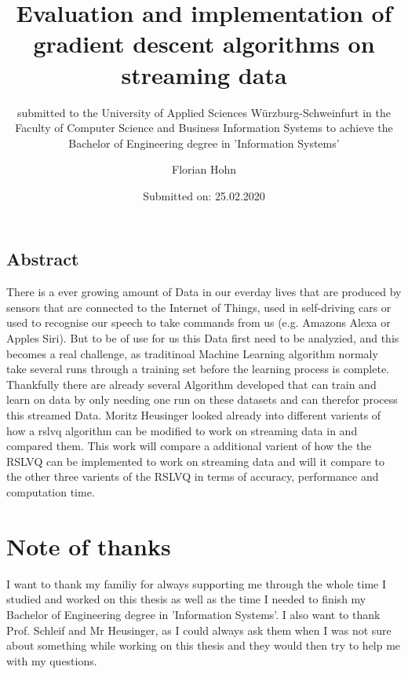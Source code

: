 \documentclass[12pt,oneside,a4paper,parskip]{scrbook}
\def\BaAuthor{Florian Hohn}
\def\BaTitle{Evaluation and implementation of gradient descent algorithms on streaming data}
\def\BaSupervisorOne{Prof.\ Dr.\ Frank-Michael Schleif}
\def\BaSupervisorTwo{Moritz Heusinger}
\def\BaDeadline{25.02.2020}
\begin{document}


\frontmatter
\titlehead{%
  {University of Applied Sciences W\"{u}rzburg-Schweinfurt
  Faculty of Computer Science and Business Information Systems}}
\subject{Bachelor-Thesis}
\title{\BaTitle\\[15mm]}
\subtitle{\normalsize{submitted to the University of Applied Sciences W\"{u}rzburg-Schweinfurt in the Faculty of Computer Science and Business Information Systems to achieve the Bachelor of Engineering degree in 'Information Systems'}}
\author{\BaAuthor}
\date{\normalsize{Submitted on: \BaDeadline}}
\publishers{
  \normalsize{First Reader: \BaSupervisorOne}\\
  \normalsize{Second Reader: \BaSupervisorTwo}\\
}


\maketitle



\section*{Abstract}
There is a ever growing amount of Data in our everday lives that are produced by sensors that are connected to 
the Internet of Things, used in self-driving cars or used to recognise our speech to take commands from us
(e.g. Amazons Alexa or Apples Siri). But to be of use for us this Data first need to be analyzied, and this 
becomes a real challenge, as traditinoal Machine Learning algorithm normaly take several runs through a training set before 
the learning process is complete.
Thankfully there are already several Algorithm developed that can train and learn on data by only needing one run on 
these datasets and can therefor process this streamed Data.
Moritz Heusinger looked already into different varients of how a \ac{rslvq} algorithm can be modified to work on streaming data
in \cite{PassiveDriftonRSLVQ} and compared them.
This work will compare a additional varient of how the the RSLVQ can be implemented to work on streaming data and will it 
compare to the other three varients of the RSLVQ in terms of accuracy, performance and computation time.

\newpage
\chapter*{Note of thanks}
I want to thank my familiy for always supporting me through the whole time I studied and worked on this thesis as well
as the time I needed to finish my Bachelor of Engineering degree in 'Information Systems'.
I also want to thank Prof. Schleif and Mr Heusinger, as I could always ask them when I was not sure about something while working on 
this thesis and they would then try to help me with my questions.
\end{document}
